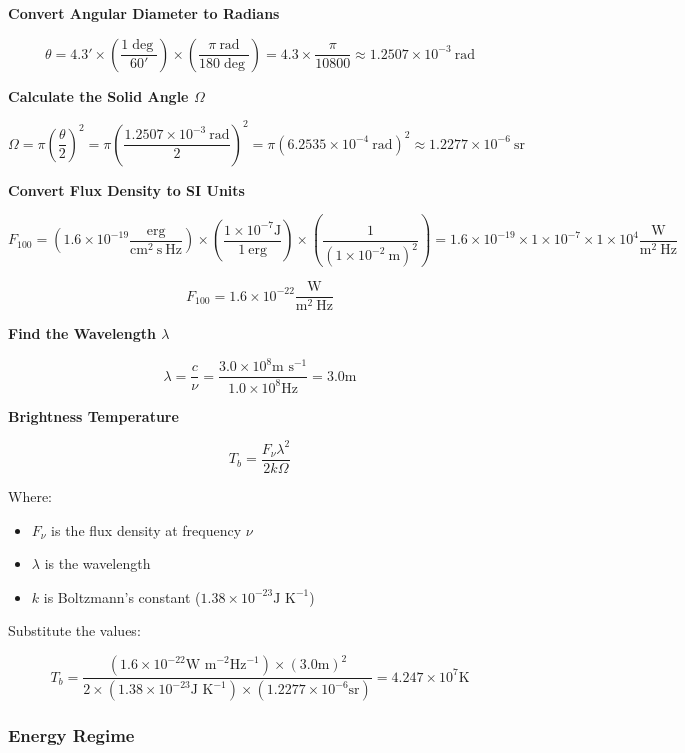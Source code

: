 \documentclass[12pt]{article}
\begin{document}
\bigskip

\textbf{Convert Angular Diameter to Radians}

{\footnotesize
    \[
        \theta = 4.3' \times \left( \dfrac{1\deg}{60'} \right) \times \left( \dfrac{\pi\ \text{rad}}{180\deg} \right) = 4.3 \times \dfrac{\pi}{10800} \approx 1.2507 \times 10^{-3}\ \text{rad}
    \]
}

\textbf{Calculate the Solid Angle $\Omega$}

{\footnotesize
    \[
        \Omega = \pi {\left( \dfrac{\theta}{2} \right)}^2 = \pi {\left( \dfrac{1.2507 \times 10^{-3}\ \text{rad}}{2} \right)}^2 = \pi {\left( 6.2535 \times 10^{-4}\ \text{rad} \right)}^2 \approx 1.2277 \times 10^{-6}\ \text{sr}
    \]
}

\textbf{Convert Flux Density to SI Units}

{\tiny
    \[
        F_{100} = \left(1.6 \times 10^{-19} \frac{\text{erg}}{\text{cm}^2\ \text{s}\ \text{Hz}}\right) \times \left( \dfrac{1 \times 10^{-7}\text{J}}{1\ \text{erg}} \right) \times \left( \dfrac{1}{{(1 \times 10^{-2}\ \text{m})}^2} \right) = 1.6 \times 10^{-19} \times 1 \times 10^{-7} \times 1 \times 10^{4} \frac{\text{W}}{\text{m}^2\ \text{Hz}}
    \]
}

\[
    F_{100} = 1.6 \times 10^{-22} \frac{\text{W}}{\text{m}^2\ \text{Hz}}
\]

\textbf{Find the Wavelength $\lambda$}

\[
    \lambda = \dfrac{c}{\nu} = \dfrac{3.0 \times 10^8\text{m s}^{-1}}{1.0 \times 10^8\text{Hz}} = 3.0\text{m}
\]

\textbf{Brightness Temperature}

\[
    T_b = \dfrac{F_\nu \lambda^2}{2 k \Omega}
\]

Where:
\begin{itemize}
    \item $F_\nu$ is the flux density at frequency $\nu$
    \item $\lambda$ is the wavelength
    \item $k$ is Boltzmann's constant ($1.38 \times 10^{-23}\text{J K}^{-1}$)
\end{itemize}

Substitute the values:

\[
    T_b = \dfrac{(1.6 \times 10^{-22}\text{W m}^{-2}\text{Hz}^{-1}) \times {(3.0\text{m})}^2}{2 \times (1.38 \times 10^{-23}\text{J K}^{-1}) \times (1.2277 \times 10^{-6}\text{sr})} = 4.247 \times 10^{7}\text{K}
\]

\subsubsection{Energy Regime}
\end{document}
